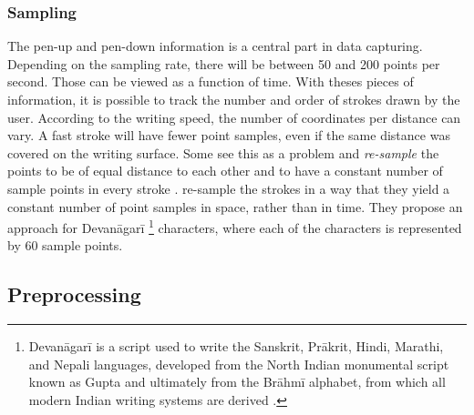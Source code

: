 

\subsubsection{Sampling}
\label{sec:sampling}

The pen-up and pen-down information is a central part in data capturing. 
Depending on the sampling rate, there will be between 50 and 200 points per 
second. Those can be viewed as a function of time.
With theses pieces of information, it is possible to track the number and order
of strokes drawn by the user. According to the writing speed, the number of 
coordinates per distance can vary. A fast stroke will have fewer point samples,
even if the same distance was covered on the writing surface.
Some see this as a problem and \emph{re-sample} the points to be of equal 
distance to each other and to have a constant number of sample points in every 
stroke .
 re-sample the strokes in a way that they yield a constant 
number of point samples in space, rather than in time. They propose an approach 
for Devanāgarī
\footnote 
{
Devanāgarī is a script used to write the Sanskrit, Prākrit, Hindi, Marathi, 
and Nepali languages, developed from the North Indian monumental script known 
as Gupta and ultimately from the Brāhmī alphabet, from which all modern Indian 
writing systems are derived \cite{EncyclopediaBritannicaDevanagari}.
} 
characters, where each of the characters is represented by 60 sample points.

\subsection{Preprocessing}
\label{sec:preprocessing}

